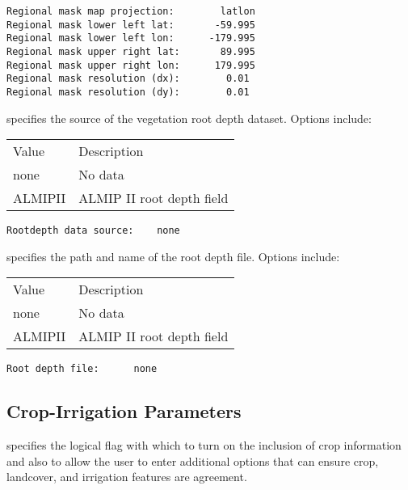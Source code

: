  \begin{Verbatim}[frame=single]
Regional mask map projection:        latlon
Regional mask lower left lat:       -59.995
Regional mask lower left lon:      -179.995
Regional mask upper right lat:       89.995
Regional mask upper right lon:      179.995
Regional mask resolution (dx):        0.01
Regional mask resolution (dy):        0.01
 \end{Verbatim}

 
  specifies the source
  of the vegetation root depth dataset.
  Options include:

 \begin{tabular}{ll}
 Value   & Description                         \\
 none    & No data         \\
 ALMIPII  & ALMIP II root depth field \\
 \end{tabular}
 

 \begin{Verbatim}[frame=single]
Rootdepth data source:    none
 \end{Verbatim}

 
  specifies the path
  and name of the root depth file.
  Options include:

 \begin{tabular}{ll}
 Value   & Description                         \\
 none    & No data         \\
 ALMIPII  & ALMIP II root depth field \\
 \end{tabular}
 

 \begin{Verbatim}[frame=single]
Root depth file:      none
 \end{Verbatim}


 
 \subsection{Crop-Irrigation Parameters} \label{ssec:cropirrigparams}
 


 
  specifies the logical flag
 with which to turn on the inclusion of crop information and also 
 to allow the user to enter additional options that can ensure
 crop, landcover, and irrigation features are agreement.
 


